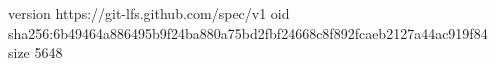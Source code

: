 version https://git-lfs.github.com/spec/v1
oid sha256:6b49464a886495b9f24ba880a75bd2fbf24668c8f892fcaeb2127a44ac919f84
size 5648

